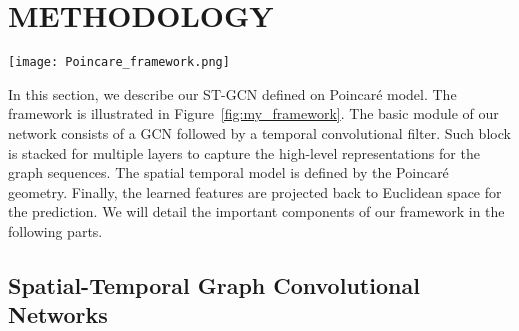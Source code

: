 \documentclass[letterpaper]{article} \usepackage{aaai19}  \usepackage{times}  \usepackage{helvet} \usepackage{courier}  \usepackage[hyphens]{url}  \usepackage{graphicx} \urlstyle{rm} \def\UrlFont{\rm}  \usepackage{graphicx}  \frenchspacing  \setlength{\pdfpagewidth}{8.5in}  \setlength{\pdfpageheight}{11in}
\begin{document}
\section{METHODOLOGY}\label{sec:method}

\begin{figure*}
    \centering
    \texttt{[image: Poincare\_framework.png]}
    \caption{Illustration of our framework. There are mainly three stages in our framework,  including (a) Graph feature embedding, (b) Extracting graph in Poincar\'e model, and (c) Classification in the Euclidean space. At the first stage, we utilize GCN filters to capture the graph representation for each frame and temporal filters are then used to capture the dynamic information. With this output from the first stage, we mix different dimensions and then project them to the tangent space, where an ST-GCN is used to extract higher-level graph representations. The feature then is mapped back to the manifold. In this way, we model the graph on the Riemannian manifold. Note here, the ST-GCN is based on the same module in stage (a) and the manifold space here is on Poincar\'e model. We stack several modules from stage (b) to capture higher-level semantic representations. After that, as shown in stage (c), the graph feature is projected back to Euclidean space such that a Euclidean loss function can be used to optimize this process.}
    \label{fig:my_framework}
\end{figure*}

In this section, we describe our ST-GCN defined on Poincar\'e model. The framework is illustrated in Figure~\ref{fig:my_framework}. The basic module of our network consists of a GCN followed by a temporal convolutional filter. Such block is stacked for multiple layers to capture the high-level representations for the graph sequences. The spatial temporal model is defined by the Poincar\'e geometry. Finally, the learned features are projected back to Euclidean space for the prediction. We will detail the important components of our framework in the following parts.

\subsection{Spatial-Temporal Graph Convolutional Networks}
\end{document}
